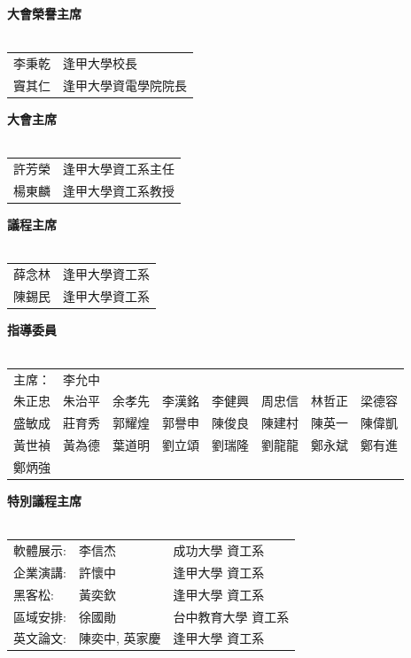 \documentclass[12pt,oneside,a4paper]{book}
\begin{document}
\textbf{大會榮譽主席}  \\ \\
\begin{tabular}{ll}
李秉乾  & 逢甲大學校長 \\
竇其仁  & 逢甲大學資電學院院長
\end{tabular}

\textbf{大會主席} \\ \\
\begin{tabular} {ll}
許芳榮 &   逢甲大學資工系主任 \\
楊東麟 &   逢甲大學資工系教授
\end{tabular}

\textbf{議程主席} \\ \\
\begin{tabular} {ll}
薛念林 & 逢甲大學資工系 \\
陳錫民 & 逢甲大學資工系
\end{tabular}

\textbf{指導委員}\\ \\
\begin{tabular}
{p{1.8cm}p{1.8cm}p{1.8cm}p{1.8cm}p{1.8cm}p{1.8cm}p{1.8cm}p{1.8cm}}
主席：& 李允中 \\
朱正忠 &朱治平 &余孝先 & 李漢銘 &    李健興 &   周忠信 &   林哲正 &   梁德容  \\  
盛敏成 & 莊育秀 &郭耀煌 & 郭譽申 &   陳俊良  &  陳建村 &    陳英一 &   陳偉凱   \\
黃世禎 &黃為德 &   葉道明  & 劉立頌  &   劉瑞隆  &  劉龍龍 &  鄭永斌 & 鄭有進  \\  
鄭炳強
\end{tabular}
 
\textbf{特別議程主席} \\ \\
\begin{tabular}{lll}
 軟體展示:  & 李信杰 &    成功大學 資工系 \\
 企業演講: & 許懷中 &   逢甲大學 資工系 \\
 黑客松:     & 黃奕欽 &   逢甲大學 資工系 \\
 區域安排: & 徐國勛  &  台中教育大學 資工系 \\
 英文論文: & 陳奕中, 英家慶 &   逢甲大學 資工系 \\
\end{tabular}
\end{document}
